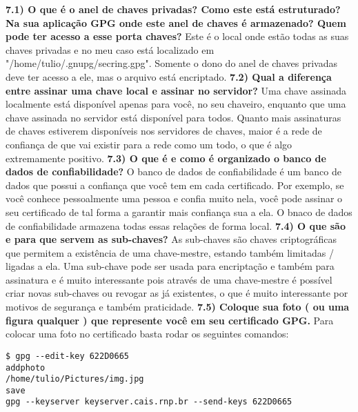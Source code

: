 \documentclass[a4paper,11pt]{article}
\theoremstyle{mytheor}
\begin{document}
\newline \noindent \textbf{7.1) O que é o anel de chaves privadas? Como este está estruturado? Na sua aplicação GPG onde este anel de chaves é armazenado? Quem pode ter acesso a esse porta chaves?}\newline
Este é o local onde estão todas as suas chaves privadas e no meu caso está localizado em "/home/tulio/.gnupg/secring.gpg". Somente o dono do anel de chaves privadas deve ter acesso a ele, mas o arquivo está encriptado.
\newline
\newline \noindent \textbf{7.2) Qual a diferença entre assinar uma chave local e assinar no servidor?}\newline
Uma chave assinada localmente está disponível apenas para você, no seu chaveiro, enquanto que uma chave assinada no servidor está disponível para todos. Quanto mais assinaturas de chaves estiverem disponíveis nos servidores de chaves, maior é a rede de confiança de que vai existir para a rede como um todo, o que é algo extremamente positivo.
\newline
\newline \noindent \textbf{7.3) O que é e como é organizado o banco de dados de confiabilidade?}\newline
O banco de dados de confiabilidade é um banco de dados que possui a confiança que você tem em cada certificado. Por exemplo, se você conhece pessoalmente uma pessoa e confia muito nela, você pode assinar o seu certificado de tal forma a garantir mais confiança sua a ela. O bnaco de dados de confiabilidade armazena todas essas relações de forma local.
\newline
\newline \noindent \textbf{7.4) O que são e para que servem as sub-chaves?}\newline
As sub-chaves são chaves criptográficas que permitem a existência de uma chave-mestre, estando também limitadas / ligadas a ela. Uma sub-chave pode ser usada para encriptação e também para assinatura e é muito interessante pois através de uma chave-mestre é possível criar novas sub-chaves ou revogar as já existentes, o que é muito interessante por motivos de segurança e também praticidade.
\newline
\newline \noindent \textbf{7.5) Coloque sua foto ( ou uma figura qualquer ) que represente você em seu certificado GPG.}\newline
Para colocar uma foto no certificado basta rodar os seguintes comandos:
\begin{lstlisting}
$ gpg --edit-key 622D0665
addphoto
/home/tulio/Pictures/img.jpg
save
gpg --keyserver keyserver.cais.rnp.br --send-keys 622D0665
\end{lstlisting}
\end{document}

